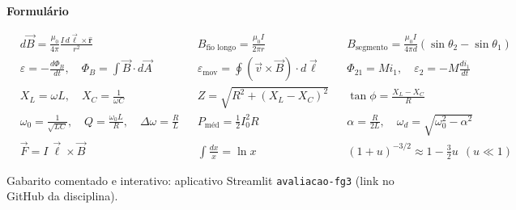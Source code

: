 \documentclass[11pt,a4paper,addpoints]{exam}
\newcommand{\vu}[1]{\hat{\boldsymbol{#1}}}
\begin{document}
\begin{questions}

\end{questions}

\newpage
\begin{center}\large\textbf{Formulário}\end{center}
\small
\begin{align*}
&d\vec B = \frac{\mu_0}{4\pi}\frac{I\,d\vec\ell\times\vu r}{r^2}
&&B_{\text{fio longo}} = \frac{\mu_0 I}{2\pi r}
&&B_{\text{segmento}} = \frac{\mu_0 I}{4\pi d}(\sin\theta_2-\sin\theta_1)\\[4pt]
&\varepsilon = -\frac{d\Phi_B}{dt},\quad \Phi_B = \int \vec B\cdot d\vec A
&&\varepsilon_{\text{mov}} = \oint (\vec v\times\vec B)\cdot d\vec\ell
&&\Phi_{21} = M i_1,\quad \varepsilon_2 = -M\frac{di_1}{dt}\\[4pt]
&X_L = \omega L,\quad X_C = \frac{1}{\omega C}
&&Z = \sqrt{R^2 + (X_L-X_C)^2}
&&\tan\phi = \frac{X_L - X_C}{R}\\[4pt]
&\omega_0 = \frac{1}{\sqrt{LC}},\quad Q = \frac{\omega_0 L}{R},\quad \Delta\omega = \frac{R}{L}
&&P_{\text{méd}} = \tfrac12 I_0^2 R
&&\alpha = \frac{R}{2L},\quad \omega_d = \sqrt{\omega_0^2-\alpha^2}\\[4pt]
&\vec F = I\,\vec\ell\times\vec B
&&\int\frac{dx}{x} = \ln x
&&(1+u)^{-3/2}\approx 1-\tfrac32 u\ \ (u\ll1)
\end{align*}

\vfill
\begin{center}\footnotesize
Gabarito comentado e interativo: aplicativo Streamlit \texttt{avaliacao-fg3} (link no GitHub da disciplina).
\end{center}
\end{document}
